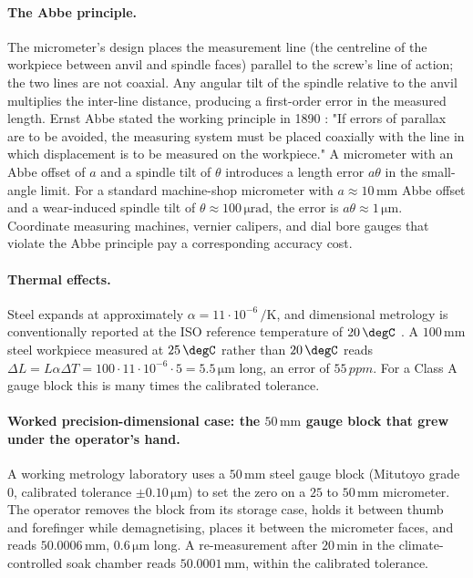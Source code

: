 \paragraph{The Abbe principle.} The micrometer's design places the
measurement line (the centreline of the workpiece between anvil and
spindle faces) parallel to the screw's line of action; the two lines
are not coaxial. Any angular tilt of the spindle relative to the
anvil multiplies the inter-line distance, producing a first-order
error in the measured length. Ernst Abbe stated the working
principle in 1890 \cite{paper:bryan-abbe-1979}: "If errors of
parallax are to be avoided, the measuring system must be placed
coaxially with the line in which displacement is to be measured on
the workpiece." A micrometer with an Abbe offset of $a$ and a
spindle tilt of $\theta$ introduces a length error $a \theta$ in
the small-angle limit. For a standard machine-shop micrometer with
$a \approx 10 \,\si{\milli\meter}$ Abbe offset and a wear-induced
spindle tilt of $\theta \approx 100 \,\si{\micro\radian}$, the
error is $a\theta \approx 1 \,\si{\micro\meter}$. Coordinate
measuring machines, vernier calipers, and dial bore gauges that
violate the Abbe principle pay a corresponding accuracy cost.

\paragraph{Thermal effects.} Steel expands at approximately
$\alpha = 11 \cdot 10^{-6} \,\si{\per\kelvin}$, and dimensional
metrology is conventionally reported at the ISO reference temperature
of $20 \,\degC$ \cite{std:iso-3650}. A $100 \,\si{\milli\meter}$
steel workpiece measured at $25 \,\degC$ rather than $20 \,\degC$
reads $\Delta L = L \alpha \Delta T = 100 \cdot 11 \cdot 10^{-6}
\cdot 5 = 5.5 \,\si{\micro\meter}$ long, an error of $55 \,\si{ppm}$. For a Class A gauge block this is many
times the calibrated tolerance.

\paragraph{Worked precision-dimensional case: the $50 \,\si{\milli
\meter}$ gauge block that grew under the operator's hand.} A
working metrology laboratory uses a $50 \,\si{\milli\meter}$ steel
gauge block (Mitutoyo grade 0, calibrated tolerance $\pm 0.10 \,\si
{\micro\meter}$) to set the zero on a $25$ to $50 \,\si{\milli
\meter}$ micrometer. The operator removes the block from its
storage case, holds it between thumb and forefinger while
demagnetising, places it between the micrometer faces, and reads
$50.0006 \,\si{\milli\meter}$, $0.6 \,\si{\micro\meter}$ long. A
re-measurement after $20 \,\si{\minute}$ in the climate-controlled
soak chamber reads $50.0001 \,\si{\milli\meter}$, within the
calibrated tolerance.


